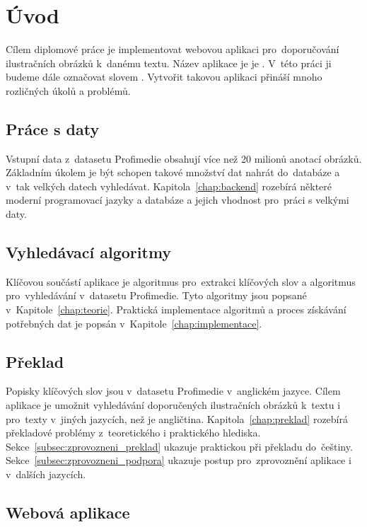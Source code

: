 \chapter{Úvod}

Cílem diplomové práce je implementovat webovou aplikaci pro~doporučování ilustračních obrázků k~danému textu. Název aplikace je je . V~této práci ji budeme dále označovat slovem . Vytvořit takovou aplikaci přináší mnoho rozličných úkolů a problémů.

\section{Práce s daty}
Vstupní data z~datasetu Profimedie obsahují více než 20 milionů anotací obrázků. Základním úkolem je být schopen takové množství dat nahrát do~databáze a v~tak velkých datech vyhledávat. Kapitola~\ref{chap:backend} rozebírá některé moderní programovací jazyky a databáze a jejich vhodnost pro~práci s velkými daty.

\section{Vyhledávací algoritmy}

Klíčovou součástí aplikace je algoritmus pro~extrakci klíčových slov a algoritmus pro~vyhledávání v~datasetu Profimedie. Tyto algoritmy jsou popsané v~Kapitole~\ref{chap:teorie}. Praktická implementace algoritmů a proces získávání potřebných dat je popsán v~Kapitole~\ref{chap:implementace}.


\section{Překlad}

Popisky klíčových slov jsou v~datasetu Profimedie v~anglickém jazyce. Cílem aplikace je umožnit vyhledávání doporučených ilustračních obrázků k~textu i pro~texty v~jiných jazycích, než je angličtina. Kapitola~\ref{chap:preklad} rozebírá překladové problémy z~teoretického i praktického hlediska. Sekce~\ref{subsec:zprovozneni_preklad} ukazuje praktickou při překladu do~češtiny. Sekce~\ref{subsec:zprovozneni_podpora} ukazuje postup pro~zprovoznění aplikace i v~dalších jazycích.


\section{Webová aplikace}

